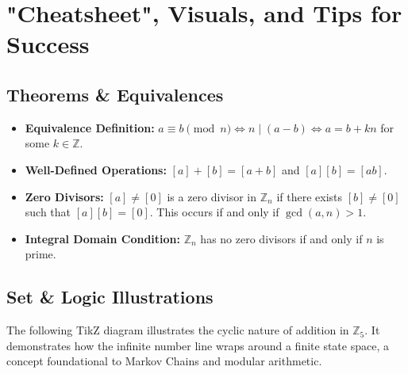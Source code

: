 \documentclass[11pt, a4paper]{article}
\theoremstyle{definition}
\theoremstyle{remark}
\newcommand{\Z}{\mathbb{Z}}
\begin{document}
\newpage
\section{"Cheatsheet", Visuals, and Tips for Success}

\subsection{Theorems \& Equivalences}
\begin{itemize}
    \item \textbf{Equivalence Definition:} $a \equiv b \pmod n \iff n \mid (a-b) \iff a = b + kn$ for some $k \in \Z$.
    \item \textbf{Well-Defined Operations:} $[a]+[b] = [a+b]$ and $[a][b] = [ab]$.
    \item \textbf{Zero Divisors:} $[a] \neq [0]$ is a zero divisor in $\Z_n$ if there exists $[b] \neq [0]$ such that $[a][b] = [0]$. This occurs if and only if $\gcd(a, n) > 1$.
    \item \textbf{Integral Domain Condition:} $\Z_n$ has no zero divisors if and only if $n$ is prime.
\end{itemize}

\subsection{Set \& Logic Illustrations}
The following TikZ diagram illustrates the cyclic nature of addition in $\Z_5$. It demonstrates how the infinite number line wraps around a finite state space, a concept foundational to Markov Chains and modular arithmetic.
\end{document}

